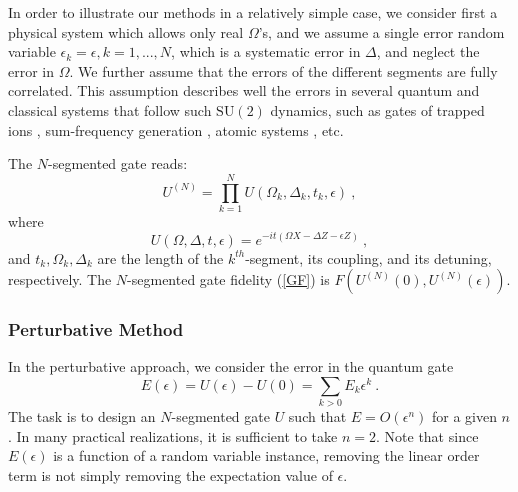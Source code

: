 \documentclass[floatfix,reprint, amsmath,amssymb,aps,superscriptaddress,nofootinbib]{revtex4-2}
\begin{document}

In order to illustrate our methods in a relatively simple case, we consider first a physical system which allows only real $\Omega$'s, and we assume a single error random variable $\epsilon_k = \epsilon, k=1,...,N$,
which is a systematic error in $\Delta$, and neglect the error in $\Omega$. We further assume that the errors of the different segments are 
fully correlated.
This assumption describes well the errors in several quantum and classical systems that follow such  $\mathrm{SU}\left(2\right)$ dynamics, such as gates of trapped ions \cite{trapped1,trapped2}, sum-frequency generation \cite{boyd2020nonlinear}, atomic systems \cite{atomic1,atomic2,atomic3}, etc.

The $N$-segmented gate reads:
\begin{equation}
    U^{\left(N\right)} = \prod_{k=1}^N   U \left(\Omega_k,\Delta_k,t_k,\epsilon\right) \ , 
\end{equation}
where
\begin{equation}
    U \left(\Omega,\Delta,t,\epsilon\right)=e^{-i t\left(\Omega X-\Delta Z-\epsilon Z \right)} \ ,
\end{equation}
and $t_k,\Omega_k,\Delta_k$ are the length of the $k^{th}$-segment, its coupling, and its detuning, respectively.
The $N$-segmented gate fidelity (\ref{GF}) is
$F(U^{(N)}(0),U^{(N)}(\epsilon))$.


\subsubsection{Perturbative Method}
In the perturbative approach, we consider the error in the quantum gate
\begin{equation}
E(\epsilon) = U(\epsilon)-U(0) = \sum_{k>0} E_k \epsilon^k \ .  
\label{E}
\end{equation}
The task is to design an $N$-segmented gate $U$ such that $E = O(\epsilon^n)$ for a given $n$. In many practical realizations, it is sufficient to take $n=2$.
Note that since $E(\epsilon)$ is a function of a random variable instance, removing the linear order
term is not simply removing the expectation value of $\epsilon$.
\end{document}
